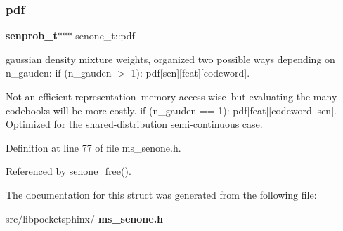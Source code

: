 \subsubsection{pdf}
{\footnotesize\ttfamily \textbf{ senprob\+\_\+t}$\ast$$\ast$$\ast$ senone\+\_\+t\+::pdf}



gaussian density mixture weights, organized two possible ways depending on n\+\_\+gauden\+: if (n\+\_\+gauden $>$ 1)\+: pdf[sen][feat][codeword]. 

Not an efficient representation--memory access-\/wise--but evaluating the many codebooks will be more costly. if (n\+\_\+gauden == 1)\+: pdf[feat][codeword][sen]. Optimized for the shared-\/distribution semi-\/continuous case. 

Definition at line 77 of file ms\+\_\+senone.\+h.



Referenced by senone\+\_\+free().



The documentation for this struct was generated from the following file\+:\begin{DoxyCompactItemize}
\item 
src/libpocketsphinx/\textbf{ ms\+\_\+senone.\+h}\end{DoxyCompactItemize}

